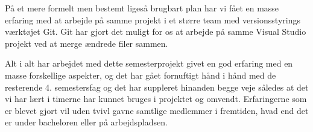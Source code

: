 På et mere formelt men bestemt ligeså brugbart plan har vi fået en masse erfaring med at arbejde på samme projekt i et større team med versionsstyrings værktøjet Git. Git har gjort det muligt for os at arbejde på samme Visual Studio projekt ved at merge ændrede filer sammen. 

Alt i alt har arbejdet med dette semesterprojekt givet en god erfaring med en masse forskellige aspekter, og det har gået fornuftigt hånd i hånd med de resterende 4. semestersfag og det har suppleret hinanden begge veje således at det vi har lært i timerne har kunnet bruges i projektet og omvendt. Erfaringerne som er blevet gjort vil uden tvivl gavne samtlige medlemmer i fremtiden, hvad end det er under bacheloren eller på arbejdspladsen.